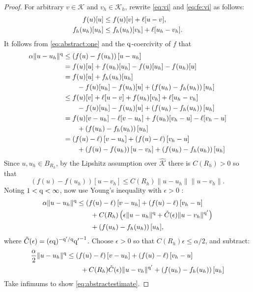 \documentclass[hidelinks,onefignum,onetabnum,final]{siamart220329}  %
\newcommand{\eps}{\epsilon}
\newcommand{\cK}{\mathcal{K}}
\newcommand{\hcK}{\widehat{\cK}}
\newcommand{\qq}{{\text{\textnormal{q}}}}
\begin{document}
\begin{proof}  For arbitrary $v\in\cK$ and $v_h\in\cK_h$, rewrite \eqref{eq:vi} and \eqref{eq:fe:vi} as follows:
\begin{align}
f(u)[u]     &\le f(u)[v] + \ell[u-v], \label{eq:abstract:one}  \\
f_h(u_h)[u_h] &\le f_h(u_h)[v_h] + \ell[u_h-v_h]. \notag
\end{align}
It follows from \eqref{eq:abstract:one} and the $\qq$-coercivity of $f$ that
\begin{align}
\alpha \|u-u_h\|^\qq &\le \left(f(u)-f(u_h)\right)[u-u_h] \label{eq:abstract:two} \\
  &= f(u)[u] + f(u_h)[u_h] - f(u)[u_h] - f(u_h)[u] \notag \\
  &= f(u)[u] + f_h(u_h)[u_h] \notag \\
  &\qquad - f(u)[u_h] - f(u_h)[u] + \left(f(u_h)-f_h(u_h)\right)[u_h] \notag \\
  &\le f(u)[v] + \ell[u-v] + f(u_h)[v_h] + \ell[u_h-v_h] \notag \\
  &\qquad - f(u)[u_h] - f(u_h)[u] + \left(f(u_h)-f_h(u_h)\right)[u_h] \notag \\
  &= f(u)[v-u_h] - \ell[v-u_h] + f(u_h)[v_h-u] - \ell[v_h-u] \notag \\
  &\qquad + \left(f(u_h)-f_h(u_h)\right)[u_h] \notag \\
  &= \left(f(u)-\ell\right)[v-u_h] + \left(f(u)-\ell\right)[v_h-u] \notag \\
  &\qquad + \left(f(u)-f(u_h)\right)[u-v_h] + \left(f(u_h)-f_h(u_h)\right)[u_h] \notag
\end{align}
Since $u,u_h\in B_{R_h}$, by the Lipshitz assumption over $\hcK$ there is $C(R_h)>0$ so that
\begin{equation}
\left(f(u)-f(u_h)\right)[u-v_h] \le C(R_h) \|u-u_h\|\|u-v_h\|. \label{eq:abstract:three}
\end{equation}
Noting $1<\qq<\infty$, now use Young's inequality with $\eps>0$ \cite[Appendix B.2]{Evans2010}:
\begin{align}
\alpha \|u-u_h\|^\qq &\le \left(f(u)-\ell\right)[v-u_h] + \left(f(u)-\ell\right)[v_h-u]  \label{eq:abstract:four} \\
  &\qquad + C(R_h) \left(\eps\|u-u_h\|^\qq + \tilde C(\eps) \|u-v_h\|^{\qq'}\right) \notag \\
  &\qquad + \left(f(u_h)-f_h(u_h)\right)[u_h], \notag
\end{align}
where $\tilde C(\eps) = (\eps \qq)^{-\qq'/\qq} {\qq'}^{-1}$.  Choose $\eps>0$ so that $C(R_h) \eps \le \alpha/2$, and subtract:
\begin{align}
\frac{\alpha}{2} \|u-u_h\|^\qq &\le \left(f(u)-\ell\right)[v-u_h] + \left(f(u)-\ell\right)[v_h-u]  \label{eq:abstract:five} \\
  &\qquad + C(R_h) \tilde C(\eps) \|u-v_h\|^{\qq'} + \left(f(u_h)-f_h(u_h)\right)[u_h] \notag
\end{align}
Take infimums to show \eqref{eq:abstractestimate}.
\end{proof}
\end{document}
